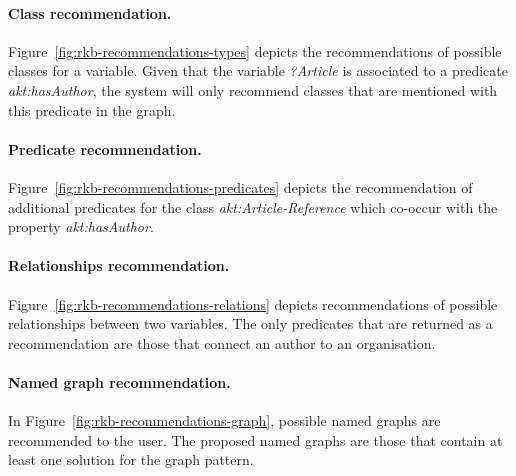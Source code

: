 \paragraph{Class recommendation.}

Figure~\ref{fig:rkb-recommendations-types} depicts the recommendations of possible classes for a variable. Given that the variable \emph{?Article} is associated to a predicate \emph{akt:hasAuthor}, the system will only recommend classes that are mentioned with this predicate in the graph.

\paragraph{Predicate recommendation.}

Figure~\ref{fig:rkb-recommendations-predicates} depicts the recommendation of additional predicates for the class \emph{akt:Article-Reference} which co-occur with the property \emph{akt:hasAuthor}.

\paragraph{Relationships recommendation.}

Figure~\ref{fig:rkb-recommendations-relations} depicts recommendations of possible relationships between two variables. The only predicates that are returned as a recommendation are those that connect an author to an organisation.

\paragraph{Named graph recommendation.}

In Figure~\ref{fig:rkb-recommendations-graph}, possible named graphs are recommended to the user. The proposed named graphs are those that contain at least one solution for the graph pattern.

